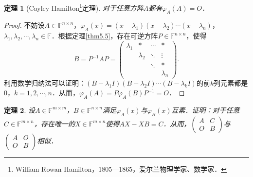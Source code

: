 \documentclass[a4paper,fontset=windows]{ctexbook}
\newtheorem{theorem}{定理}[chapter]
\theoremstyle{definition}
\begin{document}
\begin{theorem}[Cayley-Hamilton\footnote{William Rowan Hamilton，1805—1865，爱尔兰物理学家、数学家．}定理]
对于任意方阵$A$都有$\varphi_A(A)=O$．
\end{theorem}

\begin{proof}
不妨设$A\in\mathbb{F}^{n\times n}$，$\varphi_A(x)=(x-\lambda_1)(x-\lambda_2)\cdots(x-\lambda_n)$，$\lambda_1,\lambda_2,\cdots,\lambda_n\in\mathbb{F}$．根据定理\ref{thm5.5}，存在可逆方阵$P\in\mathbb{F}^{n\times n}$，使得
$$B=P^{-1}AP=\begin{pmatrix}\lambda_1&*&\cdots&* \\ &\lambda_2&\ddots&\vdots \\ &&\ddots&* \\ &&&\lambda_n\end{pmatrix}.$$
利用数学归纳法可以证明：$(B-\lambda_1I)(B-\lambda_2I)\cdots(B-\lambda_kI)$的前$k$列元素都是0，$k=1,2,\cdots,n$．从而，$\varphi_A(A)=P\varphi_A(B)P^{-1}=O$．
\end{proof}

\begin{theorem}\label{thm5.8}
设$A\in\mathbb{F}^{m\times m}$，$B\in\mathbb{F}^{n\times n}$满足$\varphi_A(x)$与$\varphi_B(x)$互素．证明：对于任意$C\in\mathbb{F}^{m\times n}$，存在唯一的$X\in\mathbb{F}^{m\times n}$使得$AX-XB=C$．从而，$\begin{pmatrix}A&C \\ O&B\end{pmatrix}$与$\begin{pmatrix}A&O \\ O&B\end{pmatrix}$相似．
\end{theorem}
\end{document}
